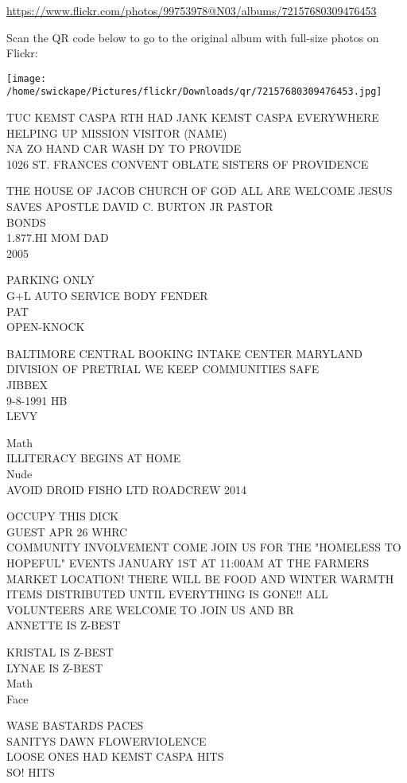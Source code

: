 \documentclass[10pt,letterpaper]{article}
\begin{document}
\url{https://www.flickr.com/photos/99753978@N03/albums/72157680309476453}

Scan the QR code below to go to the original album with full-size photos on Flickr:

\texttt{[image: /home/swickape/Pictures/flickr/Downloads/qr/72157680309476453.jpg]}


TUC KEMST CASPA RTH HAD JANK KEMST CASPA EVERYWHERE\\
HELPING UP MISSION VISITOR (NAME)\\
NA ZO HAND CAR WASH DY TO PROVIDE\\
1026 ST. FRANCES CONVENT OBLATE SISTERS OF PROVIDENCE

THE HOUSE OF JACOB CHURCH OF GOD ALL ARE WELCOME JESUS SAVES APOSTLE DAVID C. BURTON JR PASTOR\\
BONDS\\
1.877.HI MOM DAD\\
2005

PARKING ONLY\\
G+L AUTO SERVICE BODY FENDER\\
PAT\\
OPEN{-}KNOCK

BALTIMORE CENTRAL BOOKING INTAKE CENTER MARYLAND DIVISION OF PRETRIAL WE KEEP COMMUNITIES SAFE\\
JIBBEX\\
9{-}8{-}1991 HB\\
LEVY

Math\\
ILLITERACY BEGINS AT HOME\\
Nude\\
AVOID DROID FISHO LTD ROADCREW 2014

OCCUPY THIS DICK\\
GUEST APR 26 WHRC\\
COMMUNITY INVOLVEMENT COME JOIN US FOR THE "HOMELESS TO HOPEFUL" EVENTS JANUARY 1ST AT 11:00AM AT THE FARMERS MARKET LOCATION!  THERE WILL BE FOOD AND WINTER WARMTH ITEMS DISTRIBUTED UNTIL EVERYTHING IS GONE!!  ALL VOLUNTEERS ARE WELCOME TO JOIN US AND BR\\
ANNETTE IS Z{-}BEST

KRISTAL IS Z{-}BEST\\
LYNAE IS Z{-}BEST\\
Math\\
Face

WASE BASTARDS PACES\\
SANITYS DAWN FLOWERVIOLENCE\\
LOOSE ONES HAD KEMST CASPA HITS\\
SO!  HITS
\end{document}
